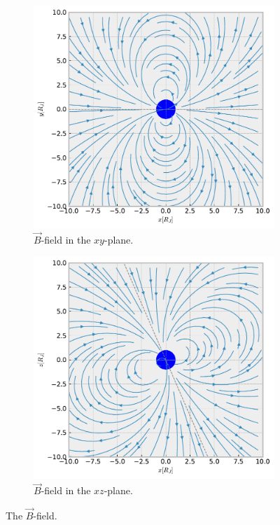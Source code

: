 \documentclass[a4paper, 12pt]{article}
\begin{document}
\begin{figure}[h]
  \centering
  \begin{subfigure}[b]{0.47\textwidth}
    \includegraphics[width=\textwidth]{media/B_field_xy_plane}
    \caption{$\vec{B}$-field in the $xy$-plane.\label{fig:xy_field}}
  \end{subfigure}
  \begin{subfigure}[b]{0.47\textwidth}
    \includegraphics[width=\textwidth]{media/B_field_xz_plane}
    \caption{$\vec{B}$-field in the $xz$-plane.\label{fig:xz_field}}
  \end{subfigure}
  \caption{The $\vec{B}$-field.}
\end{figure}
\end{document}
